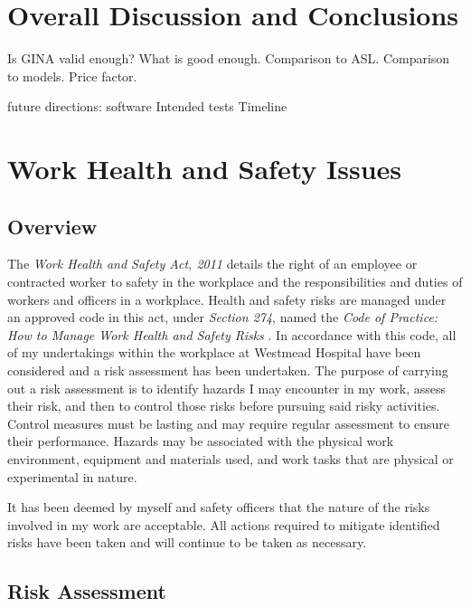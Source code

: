 \documentclass[12pt, openany, oneside]{book}
\begin{document}


\chapter{Overall Discussion and Conclusions}
Is GINA valid enough? What is good enough. Comparison to ASL. Comparison to models.
Price factor.

future directions:
software
Intended tests
Timeline







\chapter{Work Health and Safety Issues}

\section{Overview}
The \textit{Work Health and Safety Act, 2011} \cite{whs2011} details the right of an employee or contracted worker to safety in the workplace and the responsibilities and duties of workers and officers in a workplace. Health and safety risks are managed under an approved code in this act, under \textit{Section 274}, named the \textit{Code of Practice: How to Manage Work Health and Safety Risks} \cite{whs2011}.
In accordance with this code, all of my undertakings within the workplace at Westmead Hospital have been considered and a risk assessment has been undertaken. The purpose of carrying out a risk assessment is to identify hazards I may encounter in my work, assess their risk, and then to control those risks before pursuing said risky activities. Control measures must be lasting and may require regular assessment to ensure their performance. Hazards may be associated with the physical work environment, equipment and materials used, and work tasks that are physical or experimental in nature.

It has been deemed by myself and safety officers that the nature of the risks involved in my work are acceptable. All actions required to mitigate identified risks have been taken and will continue to be taken as necessary.
\section{Risk Assessment}
\end{document}
